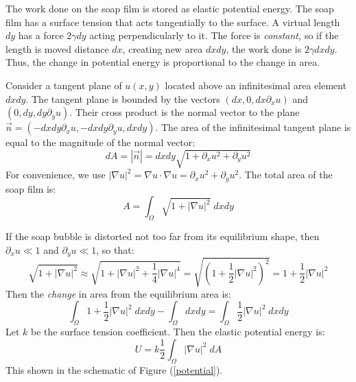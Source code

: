 \documentclass[12pt, a4paper, twoside, openright]{book}
\begin{document}
The work done on the soap film is stored as elastic potential energy.  The soap film has a surface tension that acts tangentially to the surface.  A virtual length $dy$ has a force $2 \gamma dy$ acting perpendicularly to it. The force is \emph{constant,} so if the length is moved distance $dx$, creating new area $dxdy$, the work done is $ 2 \gamma dxdy$.  Thus, the change in potential energy is proportional to the change in area.

Consider a tangent plane of $u(x,y)$ located above an infinitesimal area element $dxdy$.  The tangent plane is bounded by the vectors $(dx,0,dx \partial_x u)$ and $(0,dy,dy \partial_y u)$. Their cross product is the normal vector to the plane\\
 $\vec{n} = (-dxdy \partial_x u, -dxdy \partial_y u, dxdy) $. The area of the infinitesimal tangent plane is equal to the magnitude of the normal vector:
\begin{equation}
dA = |\vec{n}| = dxdy \sqrt{1 + \partial_x u^2 + \partial_y u^2}
\end{equation}
For convenience, we use $|\nabla u|^2 = \nabla u \cdot \nabla u = \partial_x u^2 + \partial_y u^2  $.  The total area of the soap film is:
\begin{equation}
A =  \int_{\Omega} \sqrt{1 + |\nabla u|^2} \;dxdy
\end{equation}

\clearpage
If the soap bubble is distorted not too far from its equilibrium shape, then $\partial_x u \ll 1$ and $\partial_y u \ll 1$, so that:
\begin{equation}
\sqrt{1 + |\nabla u|^2} \approx \sqrt{1 + |\nabla u|^2 + \frac{1}{4} |\nabla u|^4}
= \sqrt{(1 + \frac{1}{2} |\nabla u|^2)^2}
= 1 + \frac{1}{2} |\nabla u|^2
\end{equation}
Then the \emph{change} in area from the equilibrium area is:
\begin{equation}
\int_{\Omega} 1 + \frac{1}{2} |\nabla u|^2 \;dxdy - \int_{\Omega} dxdy = 
\int_{\Omega} \frac{1}{2} |\nabla u|^2 \;dxdy
\end{equation}
Let $k$ be the surface tension coefficient.  Then the elastic potential energy is:
\begin{equation}
U = k \frac{1}{2} \int_{\Omega}  |\nabla u|^2 \;dA 
\end{equation} 
This shown in the schematic of Figure (\ref{potential}).
\end{document}

